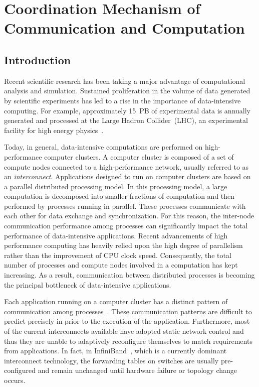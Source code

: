 \chapter{Coordination Mechanism of Communication and Computation}\label{sec:iv}

\section{Introduction}\label{sec:iv-introduction}

Recent scientific research has been taking a major advantage of
computational analysis and simulation. Sustained proliferation in the volume of
data generated by scientific experiments has led to a rise in the importance
of data-intensive computing. For example, approximately 15~PB of experimental
data is annually generated and processed at the Large Hadron Collider~(LHC),
an experimental facility for high energy physics~\autocite{Bird2011}.

Today, in general, data-intensive computations are performed on
high-performance computer clusters. A computer cluster is composed of a
set of compute nodes connected to a high-performance network, usually
referred to as an \emph{interconnect}. Applications designed to run on
computer clusters are based on a parallel distributed processing model.
In this processing model, a large computation is decomposed into smaller
fractions of computation and then performed by processes running in
parallel. These processes communicate with each other for data exchange
and synchronization. For this reason, the inter-node communication
performance among processes can significantly impact the total
performance of data-intensive applications. Recent advancements of high
performance computing has heavily relied upon the high degree of
parallelism rather than the improvement of CPU clock speed.
Consequently, the total number of processes and compute nodes involved
in a computation has kept increasing. As a result, communication between
distributed processes is becoming the principal bottleneck of
data-intensive applications.

Each application running on a computer cluster has a distinct pattern of
communication among processes~\autocite{Kamil2010}. These communication
patterns are difficult to predict precisely in prior to the execution of
the application. Furthermore, most of the current interconnects
available have adopted static network control and thus they are unable to
adaptively reconfigure themselves to match requirements from
applications. In fact, in InfiniBand~\autocite{Buyya2009}, which is
a currently dominant interconnect technology, the forwarding tables on
switches are usually pre-configured and remain unchanged until hardware
failure or topology change occurs.

